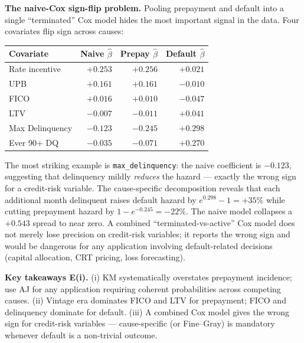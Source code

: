 \documentclass[11pt,a4paper]{article}
\begin{document}
\textbf{The naive-Cox sign-flip problem.} Pooling prepayment and default into a single ``terminated'' Cox model hides the most important signal in the data. Four covariates flip sign across causes:

\begin{center}
  \small
  \begin{tabular}{lrrr}
    \toprule
    Covariate        & Naive $\hat\beta$ & Prepay $\hat\beta$ & Default $\hat\beta$ \\
    \midrule
    Rate incentive   & $+0.253$          & $+0.256$           & $+0.021$            \\
    UPB              & $+0.161$          & $+0.161$           & $-0.010$            \\
    \midrule
    FICO             & $+0.016$          & $+0.010$           & $-0.047$            \\
    LTV              & $-0.007$          & $-0.011$           & $+0.041$            \\
    Max Delinquency  & $-0.123$          & $-0.245$           & $+0.298$            \\
    Ever 90+ DQ      & $-0.035$          & $-0.071$           & $+0.270$            \\
    \bottomrule
  \end{tabular}
\end{center}

The most striking example is \texttt{max\_delinquency}: the naive coefficient is $-0.123$, suggesting that delinquency mildly \emph{reduces} the hazard --- exactly the wrong sign for a credit-risk variable. The cause-specific decomposition reveals that each additional month delinquent raises default hazard by $e^{0.298}-1 = +35\%$ while cutting prepayment hazard by $1 - e^{-0.245} = -22\%$. The naive model collapses a $+0.543$ spread to near zero. A combined ``terminated-vs-active'' Cox model does not merely lose precision on credit-risk variables; it reports the wrong sign and would be dangerous for any application involving default-related decisions (capital allocation, CRT pricing, loss forecasting).

\textbf{Key takeaways E(i).} (i) KM systematically overstates prepayment incidence; use AJ for any application requiring coherent probabilities across competing causes. (ii) Vintage era dominates FICO and LTV for prepayment; FICO and delinquency dominate for default. (iii) A combined Cox model gives the wrong sign for credit-risk variables --- cause-specific (or Fine--Gray) is mandatory whenever default is a non-trivial outcome.
\end{document}
